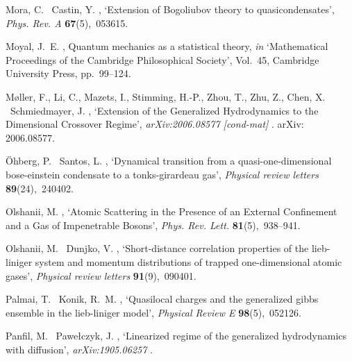 \documentclass[onecolumn,amsfonts,showpacs,superscriptaddress]{revtex4-1}
\begin{document}
\begin{thebibliography}{xx}
Mora, C. \harvardand\ Castin, Y.  \harvardyearright ,
  `Extension of {Bogoliubov} theory to quasicondensates', {\em Phys. Rev. A}
  {\bf 67}(5),~053615.

Moyal, J.~E.  \harvardyearright , Quantum mechanics as a
  statistical theory, {\em in} `Mathematical Proceedings of the Cambridge
  Philosophical Society', Vol.~45, Cambridge University Press, pp.~99--124.

Møller, F., Li, C., Mazets, I., Stimming, H.-P., Zhou, T., Zhu, Z., Chen, X.
  \harvardand\ Schmiedmayer, J.  \harvardyearright ,
  `Extension of the {Generalized} {Hydrodynamics} to the {Dimensional}
  {Crossover} {Regime}', {\em arXiv:2006.08577 [cond-mat]} .
\newblock arXiv: 2006.08577.

{\"O}hberg, P. \harvardand\ Santos, L.  \harvardyearright
  , `Dynamical transition from a quasi-one-dimensional bose-einstein condensate
  to a tonks-girardeau gas', {\em Physical review letters} {\bf
  89}(24),~240402.

Olshanii, M.  \harvardyearright , `Atomic {Scattering} in
  the {Presence} of an {External} {Confinement} and a {Gas} of {Impenetrable}
  {Bosons}', {\em Phys. Rev. Lett.} {\bf 81}(5),~938--941.

Olshanii, M. \harvardand\ Dunjko, V.  \harvardyearright ,
  `Short-distance correlation properties of the lieb-liniger system and
  momentum distributions of trapped one-dimensional atomic gases', {\em
  Physical review letters} {\bf 91}(9),~090401.

Palmai, T. \harvardand\ Konik, R.~M.  \harvardyearright ,
  `Quasilocal charges and the generalized gibbs ensemble in the lieb-liniger
  model', {\em Physical Review E} {\bf 98}(5),~052126.

Panfil, M. \harvardand\ Pawe{\l}czyk, J.  \harvardyearright , `Linearized regime of the generalized hydrodynamics
  with diffusion', {\em arXiv:1905.06257} .


\end{thebibliography}
\end{document}
